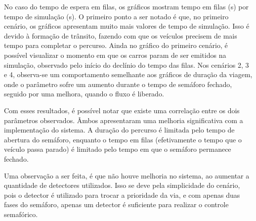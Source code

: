 No caso do tempo de espera em filas, os gráficos mostram tempo em filas (s) por tempo de simulação (s). O primeiro ponto a ser notado é que, no primeiro cenário, os gráficos apresentam muito mais valores de tempo de simulação. Isso é devido à formação de trânsito, fazendo com que os veículos precisem de mais tempo para completar o percurso. Ainda no gráfico do primeiro cenário, é possível visualizar o momento em que os carros param de ser emitidos na simulação, observado pelo início do declínio do tempo das filas.
Nos cenários 2, 3 e 4, observa-se um comportamento semelhante aos gráficos de duração da viagem, onde o parâmetro sofre um aumento durante o tempo de semáforo fechado, seguido por uma melhora, quando o fluxo é liberado.

Com esses resultados, é possível notar que existe uma correlação entre os dois parâmetros observados. Âmbos apresentaram uma melhoria significativa com a implementação do sistema. A duração do percurso é limitada pelo tempo de abertura do semáforo, enquanto o tempo em filas (efetivamente o tempo que o veículo passa parado) é limitado pelo tempo em que o semáforo permanece fechado.

Uma observação a ser feita, é que não houve melhoria no sistema, ao aumentar a quantidade de detectores utilizados. Isso se deve pela simplicidade do cenário, pois o detector é utilizado para trocar a prioridade da via, e com apenas duas fases do semáforo, apenas um detector é suficiente para realizar o controle semafórico. 